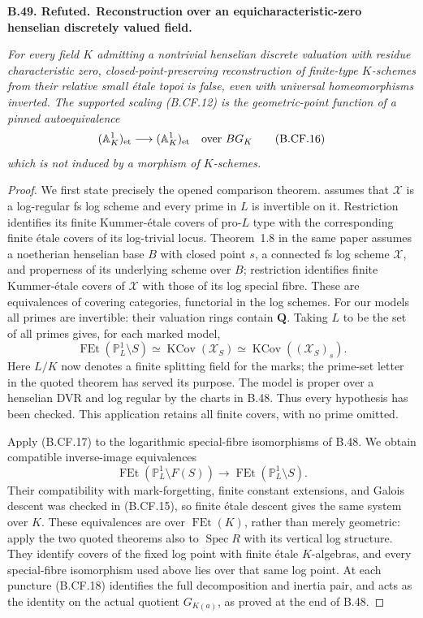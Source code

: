 \documentclass[11pt,a4paper]{article}
\newcommand{\Q}{\mathbf Q}
\providecommand{\mathscr}{\mathcal}
\newenvironment{claim}[3]{\par\medskip\noindent\hypertarget{#1}{\textbf{#1. #2.}}\ \textbf{#3.}\par\nopagebreak\smallskip\begingroup\itshape}{\endgroup\par\smallskip}
\begin{document}
\begin{claim}{B.49}{Refuted}{Reconstruction over an equicharacteristic-zero henselian discretely valued field}
For every field \(K\) admitting a nontrivial henselian discrete
valuation with residue characteristic zero, closed-point-preserving
reconstruction of finite-type \(K\)-schemes from their relative
small étale topoi is false, even with universal homeomorphisms
inverted. The supported scaling (B.CF.12) is the geometric-point
function of a pinned autoequivalence
\[
          (\mathbb A^1_K)_{\mathrm{et}}
             \longrightarrow(\mathbb A^1_K)_{\mathrm{et}}
                  \quad\hbox{over }BG_K                 \tag{B.CF.16}
\]
which is not induced by a morphism of \(K\)-schemes.
\end{claim}
\begin{proof}
We first state precisely the opened comparison theorem.
\citep[Theorem~1.6]{Lepage2013} assumes that \(\mathscr X\) is a
log-regular fs log scheme and every prime in \(L\) is invertible
on it. Restriction identifies its finite Kummer-étale covers of
pro-\(L\) type with the corresponding finite étale covers of its
log-trivial locus. Theorem~1.8 in the same paper assumes a
noetherian henselian base \(B\) with closed point \(s\), a
connected fs log scheme \(\mathscr X\), and properness of its
underlying scheme over \(B\); restriction identifies finite
Kummer-étale covers of \(\mathscr X\) with those of its log
special fibre. These are equivalences of covering categories,
functorial in the log schemes. For our models all primes are
invertible: their valuation rings contain \(\Q\). Taking
\(L\) to be the set of all primes gives, for each marked model,
\[
 \operatorname{FEt}(\mathbb P^1_L\setminus S)
       \simeq\operatorname{KCov}(\mathscr X_S)
       \simeq\operatorname{KCov}((\mathscr X_S)_s).
                                                        \tag{B.CF.17}
\]
Here \(L/K\) now denotes a finite splitting field for the marks;
the prime-set letter in the quoted theorem has served its purpose.
The model is proper over a henselian DVR and log regular by the
charts in B.48. Thus every hypothesis has been checked. This
application retains all finite covers, with no prime omitted.

Apply (B.CF.17) to the logarithmic special-fibre isomorphisms of
B.48. We obtain compatible inverse-image equivalences
\[
 \operatorname{FEt}(\mathbb P^1_L\setminus F(S))
           \longrightarrow
 \operatorname{FEt}(\mathbb P^1_L\setminus S).            \tag{B.CF.18}
\]
Their compatibility with mark-forgetting, finite constant
extensions, and Galois descent was checked in (B.CF.15), so
finite étale descent gives the same system over \(K\).
These equivalences are over \(\operatorname{FEt}(K)\), rather
than merely geometric: apply the two quoted theorems also to
\(\operatorname{Spec}R\) with its vertical log structure.
They identify covers of the fixed log point with finite étale
\(K\)-algebras, and every special-fibre isomorphism used above
lies over that same log point. At each puncture (B.CF.18)
identifies the full decomposition and inertia pair, and acts as
the identity on the actual quotient \(G_{K(a)}\), as proved
at the end of B.48.


\end{proof}
\end{document}
